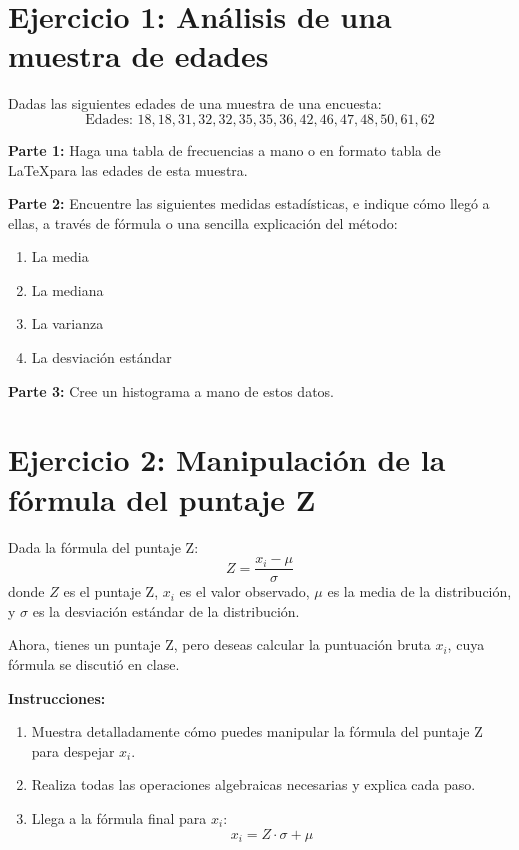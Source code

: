 \documentclass[11pt]{article}
\begin{document}
\begin{enumerate}
\end{enumerate}

\section*{Ejercicio 1: Análisis de una muestra de edades}

Dadas las siguientes edades de una muestra de una encuesta:
\[
\text{Edades: } 18, 18, 31, 32, 32, 35, 35, 36, 42, 46, 47, 48, 50, 61, 62
\]

\textbf{Parte 1:} Haga una tabla de frecuencias a mano o en formato tabla de \LaTeX para las edades de esta muestra.

\vspace{5cm} %

\textbf{Parte 2:} Encuentre las siguientes medidas estadísticas, e indique cómo llegó a ellas, a través de fórmula o una sencilla explicación del método:
\begin{enumerate}
    \item La media
    \item La mediana
    \item La varianza
    \item La desviación estándar
\end{enumerate}



\textbf{Parte 3:} Cree un histograma a mano de estos datos.

\vspace{8cm} %

\section*{Ejercicio 2: Manipulación de la fórmula del puntaje Z}

Dada la fórmula del puntaje Z:
\[
Z = \frac{x_i - \mu}{\sigma}
\]
donde \(Z\) es el puntaje Z, \(x_i\) es el valor observado, \(\mu\) es la media de la distribución, y \(\sigma\) es la desviación estándar de la distribución.

Ahora, tienes un puntaje Z, pero deseas calcular la puntuación bruta \(x_i\), cuya fórmula se discutió en clase.

\textbf{Instrucciones:}

\begin{enumerate}
    \item Muestra detalladamente cómo puedes manipular la fórmula del puntaje Z para despejar \(x_i\).
    \item Realiza todas las operaciones algebraicas necesarias y explica cada paso.
    \item Llega a la fórmula final para \(x_i\):
    \[
    x_i = Z \cdot \sigma + \mu
    \]
\end{enumerate}
\vspace{1cm}
\end{document}

